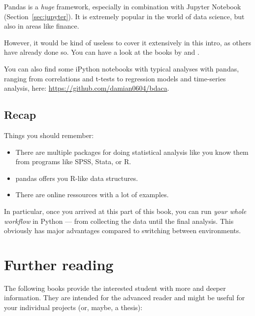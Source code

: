 \documentclass[a4paper,12pt]{book}
\begin{document}
Pandas is a \emph{huge} framework, especially in combination with Jupyter Notebook (Section~\ref{sec:jupyter}). It is extremely popular in the world of data science, but also in areas like finance. 

However, it would be kind of useless to cover it extensively in this intro, as others have already done so. You can have a look at the books by \cite{McKinney2012} and  \cite{Russel2013}. 

You can also find some iPython notebooks with typical analyses with pandas, ranging from correlations and t-tests to regression models and time-series analysis, here: \url{https://github.com/damian0604/bdaca}. 



\section{Recap}
Things you should remember:
\begin{itemize}
	\item There are multiple packages for doing statistical analysis like you know them from programs like SPSS, Stata, or R.
	\item pandas offers you R-like data structures.
	\item There are online ressources with a lot of examples.
\end{itemize}
In particular, once you arrived at this part of this book, you can run \emph{your whole workflow} in Python --- from collecting the data until the final analysis. This obviously has major advantages compared to switching between environments.


\chapter{Further reading}
The following books provide the interested student with more and deeper information. They are intended for the advanced reader and might be useful for your individual projects (or, maybe, a thesis):
\end{document}
